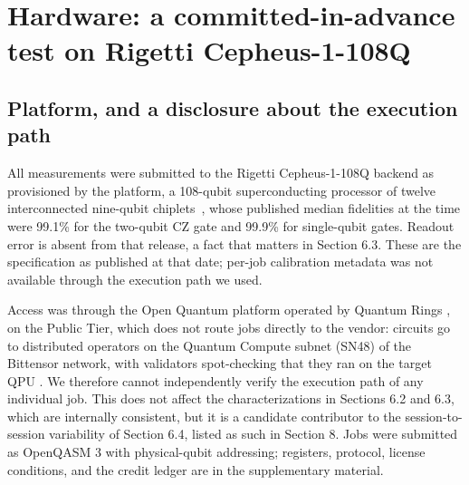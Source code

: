 %
%

\hypertarget{hardware-a-pre-registered-test-on-rigetti-cepheus-1-108q}{%
\section{Hardware: a committed-in-advance test on Rigetti
Cepheus-1-108Q}\label{hardware-a-pre-registered-test-on-rigetti-cepheus-1-108q}}

\hypertarget{platform-and-a-disclosure-about-the-execution-path}{%
\subsection{Platform, and a disclosure about the execution
path}\label{platform-and-a-disclosure-about-the-execution-path}}

All measurements were submitted to the Rigetti Cepheus-1-108Q backend as
provisioned by the platform, a 108-qubit superconducting processor of
twelve interconnected nine-qubit chiplets~\cite{rigetti2026cepheus}, whose
published median fidelities at the time were 99.1\% for the two-qubit CZ
gate and 99.9\% for single-qubit gates. Readout error is absent from that
release, a fact that matters in Section 6.3. These are the specification
as published at that date; per-job calibration metadata was not available
through the execution path we used.

Access was through the Open Quantum platform operated by Quantum Rings
\cite{wold2025openquantum}, on the Public Tier, which does not route jobs
directly to the vendor: circuits go to distributed operators on the
Quantum Compute subnet (SN48) of the Bittensor network, with validators
spot-checking that they ran on the target QPU \cite{wold2025openquantum}.
We therefore cannot
independently verify the execution path of any individual job. This does
not affect the characterizations in Sections 6.2 and 6.3, which are
internally consistent, but it is a candidate contributor to the
session-to-session variability of Section 6.4, listed as such in Section
8. Jobs were submitted as OpenQASM 3 with physical-qubit addressing;
registers, protocol, license conditions, and the credit ledger are in the
supplementary material.

